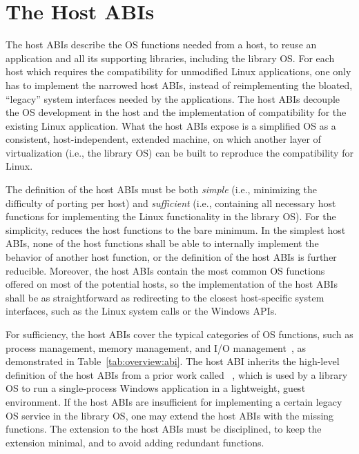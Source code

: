 \section{The Host ABIs}
\label{sec:overview:host}

The \graphene{} host ABIs
describe the OS functions needed from a host,
to reuse an application and all its supporting libraries, including the \graphene{} library OS. 
For each host which requires the compatibility for unmodified Linux applications, one only has to implement the narrowed host ABIs,
instead of reimplementing the bloated, ``legacy'' system interfaces
needed by the applications.
The host ABIs decouple the OS development in the host and the implementation of compatibility for the existing Linux application.
What the host ABIs expose is a simplified OS as a consistent, host-independent,  extended machine,
on which another layer of virtualization (i.e., the library OS) can be built to reproduce the compatibility for Linux.

The definition of the host ABIs must be both
{\em simple} (i.e., minimizing the difficulty of porting per host)
and {\em sufficient} (i.e., containing all necessary host functions for implementing the Linux functionality in the library OS).
For the simplicity, \graphene{} reduces the host functions
to the bare minimum.
In the simplest host ABIs, none of the host functions shall be able to internally implement the behavior of another host function,
or the definition of the host ABIs is further reducible.
Moreover, the host ABIs contain the most common OS functions
offered on most of the potential hosts,
so the implementation of the host ABIs shall be as straightforward as redirecting to the closest host-specific system interfaces,
such as the Linux system calls or the Windows APIs.


For sufficiency, the host ABIs cover the typical categories of OS functions, such as process management,
memory management, and I/O management~\cite{dhamdhere2007os-textbook},
as demonstrated in Table~\ref{tab:overview:abi}.
The host ABI inherits the high-level definition of the host ABIs from a prior work called \drawbridge{}~\cite{porter11drawbridge},
which is used by a library OS to run a single-process Windows application
in a lightweight, guest environment.
If the host ABIs are insufficient for implementing a certain legacy OS service in the library OS, one may extend the host ABIs with the missing functions.
The extension to the host ABIs must be disciplined, to keep the extension minimal, and to avoid adding redundant functions.


